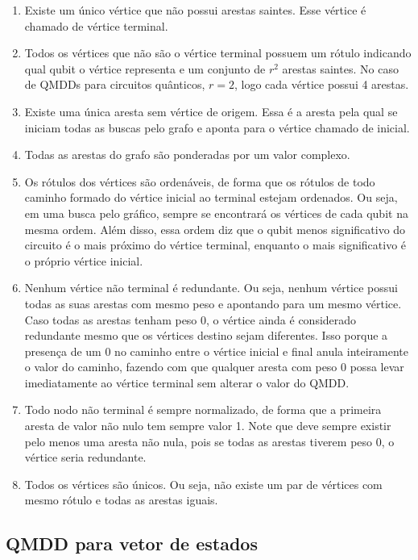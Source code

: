 \begin{enumerate}
  \item Existe um único vértice que não possui arestas saintes. Esse vértice é chamado de vértice terminal.
  \item Todos os vértices que não são o vértice terminal possuem um rótulo indicando qual qubit o vértice representa e um conjunto de $r^2$ arestas saintes. \cite{fujita1997multi} No caso de QMDDs para circuitos quânticos, $r=2$, logo cada vértice possui 4 arestas.
  \item Existe uma única aresta sem vértice de origem. Essa é a aresta pela qual se iniciam todas as buscas pelo grafo e aponta para o vértice chamado de inicial.
  \item Todas as arestas do grafo são ponderadas por um valor complexo.
  \item Os rótulos dos vértices são ordenáveis, de forma que os rótulos de todo caminho formado do vértice inicial ao terminal estejam ordenados. Ou seja, em uma busca pelo gráfico, sempre se encontrará os vértices de cada qubit na mesma ordem. Além disso, essa ordem diz que o qubit menos significativo do circuito é o mais próximo do vértice terminal, enquanto o mais significativo é o próprio vértice inicial.
  \item Nenhum vértice não terminal é redundante. Ou seja, nenhum vértice possui todas as suas arestas com mesmo peso e apontando para um mesmo vértice. Caso todas as arestas tenham peso 0, o vértice ainda é considerado redundante mesmo que os vértices destino sejam diferentes. Isso porque a presença de um 0 no caminho entre o vértice inicial e final anula inteiramente o valor do caminho, fazendo com que qualquer aresta com peso 0 possa levar imediatamente ao vértice terminal sem alterar o valor do QMDD.
  \item Todo nodo não terminal é sempre normalizado, de forma que a primeira aresta de valor não nulo tem sempre valor 1. Note que deve sempre existir pelo menos uma aresta não nula, pois se todas as arestas tiverem peso 0, o vértice seria redundante.
  \item Todos os vértices são únicos. Ou seja, não existe um par de vértices com mesmo rótulo e todas as arestas iguais.
\end{enumerate}

\subsection{QMDD para vetor de estados}\label{sub:qmddvec}

